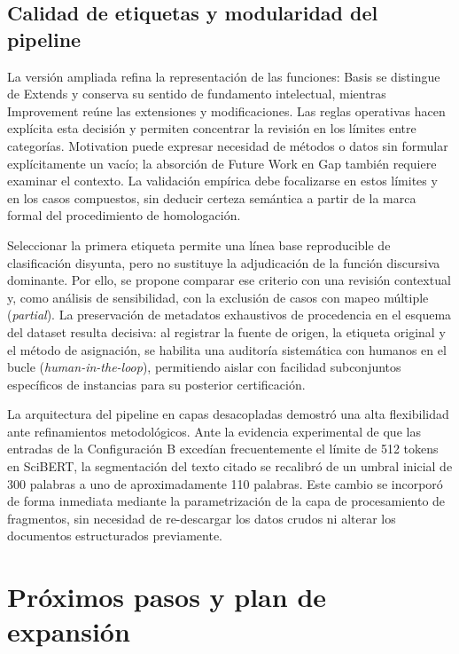 \documentclass[10pt,a4paper,twocolumn]{article}
\begin{document}
\subsection{Calidad de etiquetas y modularidad del pipeline}
La versión ampliada refina la representación de las funciones: Basis se distingue de Extends y conserva su sentido de fundamento intelectual, mientras Improvement reúne las extensiones y modificaciones. Las reglas operativas hacen explícita esta decisión y permiten concentrar la revisión en los límites entre categorías. Motivation puede expresar necesidad de métodos o datos sin formular explícitamente un vacío; la absorción de Future Work en Gap también requiere examinar el contexto. La validación empírica debe focalizarse en estos límites y en los casos compuestos, sin deducir certeza semántica a partir de la marca formal del procedimiento de homologación.

Seleccionar la primera etiqueta permite una línea base reproducible de clasificación disyunta, pero no sustituye la adjudicación de la función discursiva dominante. Por ello, se propone comparar ese criterio con una revisión contextual y, como análisis de sensibilidad, con la exclusión de casos con mapeo múltiple (\textit{partial}). La preservación de metadatos exhaustivos de procedencia en el esquema del dataset resulta decisiva: al registrar la fuente de origen, la etiqueta original y el método de asignación, se habilita una auditoría sistemática con humanos en el bucle (\textit{human-in-the-loop}), permitiendo aislar con facilidad subconjuntos específicos de instancias para su posterior certificación.

La arquitectura del pipeline en capas desacopladas demostró una alta flexibilidad ante refinamientos metodológicos. Ante la evidencia experimental de que las entradas de la Configuración B excedían frecuentemente el límite de 512 tokens en SciBERT, la segmentación del texto citado se recalibró de un umbral inicial de 300 palabras a uno de aproximadamente 110 palabras. Este cambio se incorporó de forma inmediata mediante la parametrización de la capa de procesamiento de fragmentos, sin necesidad de re-descargar los datos crudos ni alterar los documentos estructurados previamente.

\section{Próximos pasos y plan de expansión}
\end{document}

